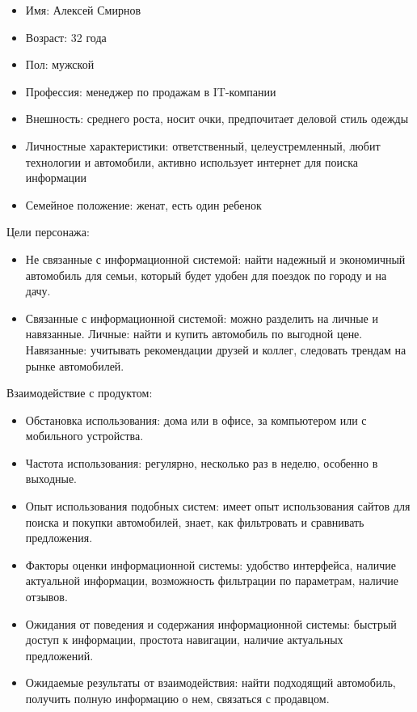 \begin{itemize}
    \item Имя: Алексей Смирнов
    \item Возраст: 32 года
    \item Пол: мужской
    \item Профессия: менеджер по продажам в IT-компании
    \item Внешность: среднего роста, носит очки, предпочитает деловой стиль одежды
    \item Личностные характеристики: ответственный, целеустремленный, любит технологии и автомобили, активно использует интернет для поиска информации
    \item Семейное положение: женат, есть один ребенок
\end{itemize}
\bigskip

Цели персонажа:

\begin{itemize}
    \item Не связанные с информационной системой: найти надежный и экономичный автомобиль для семьи, который будет удобен для поездок по городу и на дачу.

    \item Связанные с информационной системой: можно разделить на личные и навязанные.
            Личные: найти и купить автомобиль по выгодной цене.
            Навязанные: учитывать рекомендации друзей и коллег, следовать трендам на рынке автомобилей.
\end{itemize}
\bigskip

Взаимодействие с продуктом:

\begin{itemize}
    \item Обстановка использования: дома или в офисе, за компьютером или с мобильного устройства.
    \item Частота использования: регулярно, несколько раз в неделю, особенно в выходные.
    \item Опыт использования подобных систем: имеет опыт использования сайтов для поиска и покупки автомобилей, знает, как фильтровать и сравнивать предложения.
    \item Факторы оценки информационной системы: удобство интерфейса, наличие актуальной информации, возможность фильтрации по параметрам, наличие отзывов.
    \item Ожидания от поведения и содержания информационной системы: быстрый доступ к информации, простота навигации, наличие актуальных предложений.
    \item Ожидаемые результаты от взаимодействия: найти подходящий автомобиль, получить полную информацию о нем, связаться с продавцом.
\end{itemize}
\bigskip

